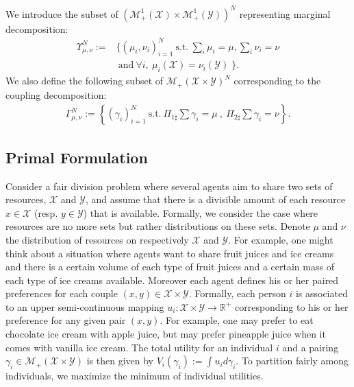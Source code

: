 We introduce the subset of $(\mathcal{M}_+^1(\mathcal{X})\times \mathcal{M}_+^1(\mathcal{Y}))^N$ representing marginal decomposition: 
\begin{align*}
 \textstyle\Upsilon_{\mu,\nu}^N:=&\Big\{(\mu_i,\nu_i)_{i=1}^N ~\mathrm{ s.t. }~ \sum_i \mu_i = \mu \mathrm{, } \sum_i \nu_i = \nu \\ 
 &~\mathrm{ and }~\forall i,~ \mu_i(\mathcal{X}) = \nu_i(\mathcal{Y})\;   \Big\}.
\end{align*}
We also define the following subset of $\mathcal{M}_+(\mathcal{X}\times \mathcal{Y})^N$ corresponding to the coupling decomposition:
\begin{align*}
    \Gamma^N_{\mu,\nu}:=\left\{(\gamma_i)_{i=1}^N~\mathrm{s.t.}~ \Pi_{1\sharp}\sum\gamma_i=\mu ~,~ \Pi_{2\sharp}\sum\gamma_i=\nu\right\} .
\end{align*}



\subsection{Primal Formulation}
\label{sec:primal-dual}
Consider a fair division problem where several agents aim to share two sets of resources, $\mathcal{X}$ and $\mathcal{Y}$, and assume that there is a divisible amount of each resource $x\in\mathcal{X}$ (resp. $y\in\mathcal{Y}$) that is available. Formally, we consider the case where resources are no more sets but rather distributions on these sets. Denote $\mu$ and $\nu$ the distribution of resources on respectively $\mathcal{X}$ and $\mathcal{Y}$. For example, one might think about a situation where agents want to share fruit juices and ice creams and there is a certain volume of each type of fruit juices and a certain mass of each type of ice creams available. Moreover each agent defines his or her paired preferences for each couple $(x,y)\in\mathcal{X}\times\mathcal{Y}$. Formally, each person $i$ is associated to an upper semi-continuous mapping  $u_i:\mathcal{X}\times\mathcal{Y}\xrightarrow{} \mathbb{R}^{+}$ corresponding to his or her preference for any given pair $(x,y)$. For example, one may prefer to eat chocolate ice cream with apple juice, but may prefer pineapple juice when it comes with vanilla ice cream. The total utility for an individual $i$ and a pairing $\gamma_i\in\mathcal{M}_+(\mathcal{X}\times\mathcal{Y})$ is then given by $V_i(\gamma_i) := \int u_i d\gamma_i$. To partition fairly among individuals, we maximize the minimum of individual utilities.

